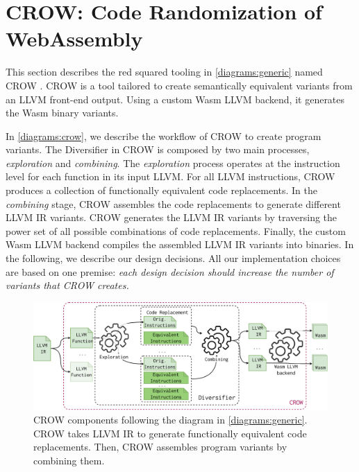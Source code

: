 
\section{CROW: Code Randomization of WebAssembly}
\label{section:crow}

This section describes the red squared tooling in \autoref{diagrams:generic} named CROW  \cite{CROW}. CROW is a tool tailored to create semantically equivalent \wasm variants from an LLVM front-end output.
Using a custom Wasm LLVM backend, it generates the Wasm binary variants.


In \autoref{diagrams:crow}, we describe the workflow of CROW to create program variants.
The Diversifier in CROW is composed by two main processes, \textit{exploration} and \textit{combining}. 
The \emph{exploration} process operates at the instruction level for each function in its input LLVM.
For all LLVM instructions, CROW produces a collection of functionally equivalent code replacements.   
In the \emph{combining} stage, CROW assembles the code replacements to generate different LLVM IR variants.
CROW generates the LLVM IR variants by traversing the power set of all possible combinations of code replacements.
Finally, the custom Wasm LLVM backend compiles the assembled LLVM IR variants into \wasm binaries.
In the following, we describe our design decisions. All our implementation choices are based on one premise: \emph{each design decision should increase the number of \wasm variants that CROW creates.}

\begin{figure}[h]
    \includegraphics[width=\linewidth]{diagrams/generation/crow.drawio.pdf}
    \caption{CROW components following the diagram in \autoref{diagrams:generic}. CROW takes LLVM IR to generate functionally equivalent code replacements. Then, CROW assembles program variants by combining them.}
    \label{diagrams:crow}
\end{figure}


